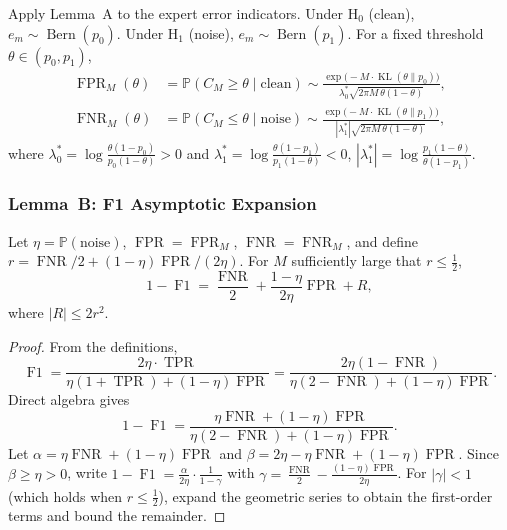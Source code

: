 Apply Lemma~A to the expert error indicators.  Under $\mathrm{H}_0$ (clean),
$e_m\sim\operatorname{Bern}(p_0)$.  Under $\mathrm{H}_1$ (noise),
$e_m\sim\operatorname{Bern}(p_1)$.  For a fixed threshold
$\theta\in(p_0,p_1)$,
\[
\begin{aligned}
\operatorname{FPR}_M(\theta)
&= \mathbb{P}(C_M\ge\theta\mid\text{clean})
   \sim \frac{\exp\!\bigl(-M\cdot\operatorname{KL}(\theta\|p_0)\bigr)}
            {\lambda_0^*\sqrt{2\pi M\,\theta(1-\theta)}},\\[4pt]
\operatorname{FNR}_M(\theta)
&= \mathbb{P}(C_M\le\theta\mid\text{noise})
   \sim \frac{\exp\!\bigl(-M\cdot\operatorname{KL}(\theta\|p_1)\bigr)}
            {|\lambda_1^*|\sqrt{2\pi M\,\theta(1-\theta)}},
\end{aligned}
\]
where $\lambda_0^*=\log\frac{\theta(1-p_0)}{p_0(1-\theta)}>0$ and
$\lambda_1^*=\log\frac{\theta(1-p_1)}{p_1(1-\theta)}<0$,
$|\lambda_1^*|=\log\frac{p_1(1-\theta)}{\theta(1-p_1)}$.

\subsubsection{Lemma~B: F1 Asymptotic Expansion}
\label{sec:lemmaB}

\begin{lemma}[F1 expansion]
  \label{lem:F1expansion}
  Let $\eta=\mathbb{P}(\text{noise})$, $\operatorname{FPR}=\operatorname{FPR}_M$,
  $\operatorname{FNR}=\operatorname{FNR}_M$, and define
  $r=\operatorname{FNR}/2+(1-\eta)\operatorname{FPR}/(2\eta)$.  For
  $M$ sufficiently large that $r\le\frac12$,
  \[
  1-\operatorname{F1}
  = \frac{\operatorname{FNR}}{2}
    + \frac{1-\eta}{2\eta}\operatorname{FPR}
    + R,
  \]
  where $|R|\le 2r^2$.
\end{lemma}

\begin{proof}
  From the definitions,
  \[
  \operatorname{F1}
  = \frac{2\eta\cdot\operatorname{TPR}}
         {\eta(1+\operatorname{TPR})+(1-\eta)\operatorname{FPR}}
  = \frac{2\eta(1-\operatorname{FNR})}
         {\eta(2-\operatorname{FNR})+(1-\eta)\operatorname{FPR}}.
  \]
  Direct algebra gives
  \[
  1-\operatorname{F1}
  = \frac{\eta\operatorname{FNR}+(1-\eta)\operatorname{FPR}}
         {\eta(2-\operatorname{FNR})+(1-\eta)\operatorname{FPR}}.
  \]
  Let $\alpha=\eta\operatorname{FNR}+(1-\eta)\operatorname{FPR}$ and
  $\beta=2\eta-\eta\operatorname{FNR}+(1-\eta)\operatorname{FPR}$.  Since
  $\beta\ge\eta>0$, write
  $1-\operatorname{F1} = \frac{\alpha}{2\eta}\cdot\frac1{1-\gamma}$
  with $\gamma=\frac{\operatorname{FNR}}2-\frac{(1-\eta)\operatorname{FPR}}{2\eta}$.
  For $|\gamma|<1$ (which holds when $r\le\frac12$), expand the geometric
  series to obtain the first-order terms and bound the remainder.
\end{proof}

